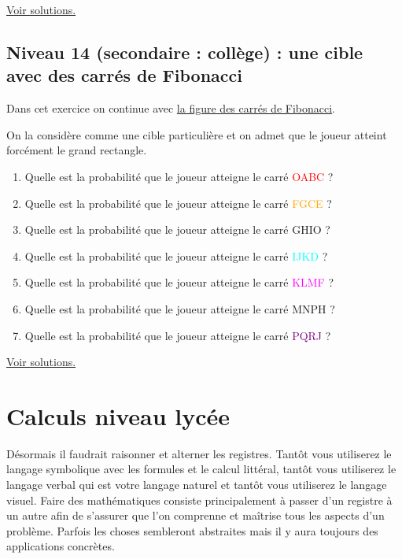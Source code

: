 \documentclass[11pt]{article}
\begin{document}
\hyperref[org977d524]{Voir solutions.}




\newpage

\subsection{Niveau 14 (secondaire : collège) : une cible avec des carrés de Fibonacci}
\label{sec:org4dc56ea}

\label{org14234af}

Dans cet exercice on continue avec \hyperref[org9bce7c2]{la figure des carrés de Fibonacci}.

On la considère comme une cible particulière et on admet que le joueur
atteint forcément le grand rectangle.



\begin{enumerate}
\item Quelle est la probabilité que le joueur atteigne le carré
\textcolor{red}{OABC} ?
\item Quelle est la probabilité que le joueur atteigne le carré
\textcolor{orange}{FGCE} ?
\item Quelle est la probabilité que le joueur atteigne le carré
\textcolor{citron}{GHIO} ?
\item Quelle est la probabilité que le joueur atteigne le carré
\textcolor{cyan}{IJKD} ?
\item Quelle est la probabilité que le joueur atteigne le carré
\textcolor{magenta}{KLMF} ?
\item Quelle est la probabilité que le joueur atteigne le carré
\textcolor{pourpre}{MNPH} ?
\item Quelle est la probabilité que le joueur atteigne le carré
\textcolor{purple}{PQRJ} ?
\end{enumerate}





\hyperref[orgdba72ef]{Voir solutions.}


\newpage

\section{Calculs niveau lycée}
\label{sec:org48199e5}

Désormais il faudrait raisonner et alterner les registres. Tantôt vous
utiliserez le langage symbolique avec les formules et le calcul
littéral, tantôt vous utiliserez le langage verbal qui est votre
langage naturel et tantôt vous utiliserez le langage visuel. Faire des
mathématiques consiste principalement à passer d'un registre à un
autre afin de s'assurer que l'on comprenne et maîtrise tous les
aspects d'un problème. Parfois les choses sembleront abstraites mais
il y aura toujours des applications concrètes.
\end{document}

